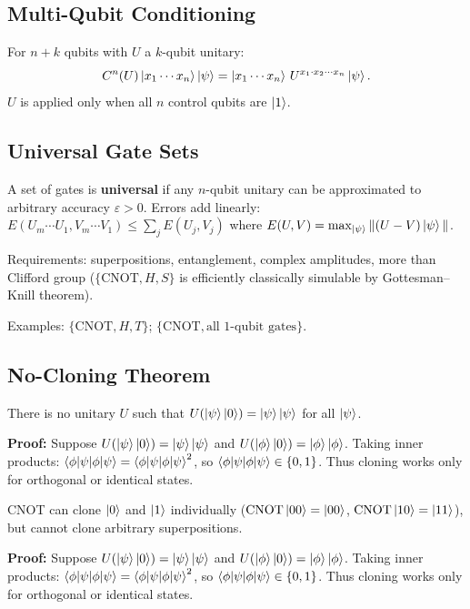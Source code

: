 \documentclass[10pt,a4paper]{article}
\begin{document}
\subsection{Multi-Qubit Conditioning}

For $n+k$ qubits with $U$ a $k$-qubit unitary:
\[
C^n(U)\ket{x_1\cdots x_n}\ket{\psi}=\ket{x_1\cdots x_n}\,U^{x_1\cdot x_2\cdots x_n}\ket{\psi}.
\]
$U$ is applied only when all $n$ control qubits are $\ket{1}$.

\subsection{Universal Gate Sets}



\begin{tcolorbox}[defstyle, title={Definition: Universal Gate Set}]
A set of gates is \textbf{universal} if any $n$-qubit unitary can be approximated to arbitrary accuracy $\varepsilon>0$. Errors add linearly: $E(U_m\cdots U_1,V_m\cdots V_1)\le\sum_j E(U_j,V_j)$ where $E(U,V)=\max_{\ket{\psi}}\|(U-V)\ket{\psi}\|$.
\end{tcolorbox}

Requirements: superpositions, entanglement, complex amplitudes, more than Clifford group ($\{\mathrm{CNOT},H,S\}$ is efficiently classically simulable by Gottesman--Knill theorem).

Examples: $\{\mathrm{CNOT},H,T\}$; $\{\mathrm{CNOT},\text{all 1-qubit gates}\}$.

\subsection{No-Cloning Theorem}

\begin{tcolorbox}[propstyle, title={Theorem: No-Cloning}]
There is no unitary $U$ such that $U(\ket{\psi}\ket{0})=\ket{\psi}\ket{\psi}$ for all $\ket{\psi}$.
\end{tcolorbox}
\textbf{Proof:} Suppose $U(\ket{\psi}\ket{0})=\ket{\psi}\ket{\psi}$ and $U(\ket{\phi}\ket{0})=\ket{\phi}\ket{\phi}$. Taking inner products: $\braket{\phi|\psi}=\braket{\phi|\psi}^2$, so $\braket{\phi|\psi}\in\{0,1\}$. Thus cloning works only for orthogonal or identical states.

CNOT can clone $\ket{0}$ and $\ket{1}$ individually ($\mathrm{CNOT}\ket{00}=\ket{00}$, $\mathrm{CNOT}\ket{10}=\ket{11}$), but cannot clone arbitrary superpositions.

\textbf{Proof:} Suppose $U(\ket{\psi}\ket{0})=\ket{\psi}\ket{\psi}$ and $U(\ket{\phi}\ket{0})=\ket{\phi}\ket{\phi}$. Taking inner products: $\braket{\phi|\psi}=\braket{\phi|\psi}^2$, so $\braket{\phi|\psi}\in\{0,1\}$. Thus cloning works only for orthogonal or identical states.
\end{document}
